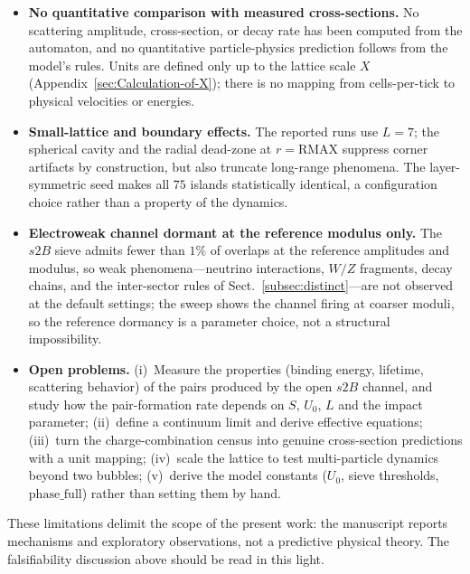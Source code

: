 \documentclass[a4paper]{article}
\begin{document}
\begin{itemize}
\item \textbf{No quantitative comparison with measured cross-sections.}  No scattering amplitude, cross-section, or decay rate has been computed from the automaton, and no quantitative particle-physics prediction follows from the model's rules.  Units are defined only up to the lattice scale $X$ (Appendix~\ref{sec:Calculation-of-X}); there is no mapping from cells-per-tick to physical velocities or energies.
\item \textbf{Small-lattice and boundary effects.}  The reported runs use $L=7$; the spherical cavity and the radial dead-zone at $r=\mathrm{RMAX}$ suppress corner artifacts by construction, but also truncate long-range phenomena.  The layer-symmetric seed makes all $75$ islands statistically identical, a configuration choice rather than a property of the dynamics.
\item \textbf{Electroweak channel dormant at the reference modulus only.}  The $s2B$ sieve admits fewer than $1\%$ of overlaps at the reference amplitudes and modulus, so weak phenomena---neutrino interactions, $W/Z$ fragments, decay chains, and the inter-sector rules of Sect.~\ref{subsec:distinct}---are not observed at the default settings; the sweep shows the channel firing at coarser moduli, so the reference dormancy is a parameter choice, not a structural impossibility.
\item \textbf{Open problems.}  (i)~Measure the properties (binding energy, lifetime, scattering behavior) of the pairs produced by the open $s2B$ channel, and study how the pair-formation rate depends on $S$, $U_0$, $L$ and the impact parameter; (ii)~define a continuum limit and derive effective equations; (iii)~turn the charge-combination census into genuine cross-section predictions with a unit mapping; (iv)~scale the lattice to test multi-particle dynamics beyond two bubbles; (v)~derive the model constants ($U_{0}$, sieve thresholds, $\mathrm{phase\_full}$) rather than setting them by hand.
\end{itemize}
These limitations delimit the scope of the present work: the manuscript reports mechanisms and exploratory observations, not a predictive physical theory.  The falsifiability discussion above should be read in this light.
\end{document}
